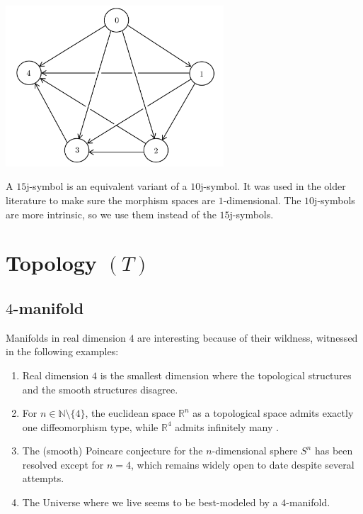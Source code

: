 \begin{definition}[$10$j-symbol]
\begin{center}
    \includegraphics[height=6cm]{10j-geometric}
  \end{center}
\end{definition}

\begin{remark}[$15$j-symbol]\label{remark/15j-symbol}
  A $15$j-symbol is an equivalent variant of a $10$j-symbol. It
  was used in the older literature to make sure the morphism
  spaces are $1$-dimensional. The $10$j-symbols are more
  intrinsic, so we use them instead of the $15$j-symbols.
\end{remark}

\section{Topology $(T)$}\label{section/topology}
\subsection{$4$-manifold}

Manifolds in real dimension $4$ are interesting because of their
wildness, witnessed in the following examples:

\begin{enumerate}
  \item Real dimension $4$ is the smallest dimension where the
        topological structures and the smooth structures
        disagree.
  \item For $n \in \mathbb{N}\setminus\{4\}$, the euclidean space
        $\mathbb{R}^{n}$ as a topological space admits exactly
        one diffeomorphism type, while $\mathbb{R}^{4}$ admits
        infinitely many
        \cite{scorpan/the-wild-world-of-4-manifolds}\cite[p.2]{milnor/topological-manifolds-and-smooth-manifolds}.
  \item The (smooth) Poincare conjecture for the $n$-dimensional
        sphere $S^{n}$ has been resolved except for $n=4$, which
        remains widely open to date despite several attempts.
  \item The Universe where we live seems to be best-modeled by a
        $4$-manifold.
\end{enumerate}

